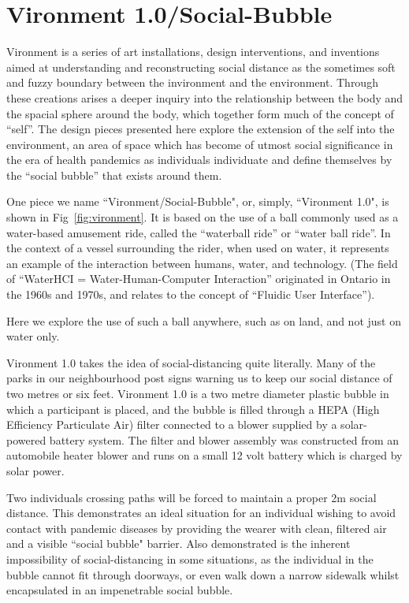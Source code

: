 \documentclass[journal]{journal}
\begin{document}
\section{Vironment 1.0/Social-Bubble}
Vironment is a series of art installations, design interventions, and inventions aimed at understanding and reconstructing social distance as the sometimes soft and fuzzy boundary between the invironment and the environment. Through these creations arises a deeper inquiry into the relationship between the body and the spacial sphere around the body, which together form much of the concept of ``self''. The design pieces presented here explore the extension of the self into the environment, an area of space which has become of utmost social significance in the era of health pandemics as individuals individuate and define themselves by the ``social bubble'' that exists around them.

One piece we name ``Vironment/Social-Bubble", or, simply, ``Vironment 1.0", is shown in Fig~\ref{fig:vironment}.  
It is based on the use of a ball commonly used as a water-based amusement ride, called the ``waterball ride'' or ``water ball ride''.
In the context of a vessel surrounding the rider, when used on water, it represents an example of the interaction between humans, water, and technology.  (The field of ``WaterHCI = Water-Human-Computer Interaction'' originated in Ontario in the 1960s and 1970s, and relates to the concept of ``Fluidic User Interface''\cite{mann2005fl}).

Here we explore the use of such a ball anywhere, such as on land, and not just on water only.

Vironment 1.0 takes the idea of social-distancing
quite literally.  Many of the parks in our neighbourhood post signs warning
us to keep our social distance of two metres or six feet.  Vironment 1.0 is a two metre diameter plastic bubble in which a participant is placed, and the bubble is
filled through a HEPA (High Efficiency Particulate Air) filter connected to
a blower supplied by a solar-powered battery system.
The filter and blower assembly was constructed from an automobile heater blower and runs on a small 12 volt battery which is charged by solar power.

Two individuals crossing paths will be forced to maintain a proper 2m social distance. This demonstrates an ideal situation for an individual wishing to avoid contact with pandemic diseases by providing the wearer with clean, filtered air and a visible ``social bubble" barrier. Also demonstrated is the inherent impossibility of social-distancing in some situations, as the individual in the bubble cannot fit through doorways,
or even walk down a narrow sidewalk whilst encapsulated in an impenetrable social bubble.
\end{document}

